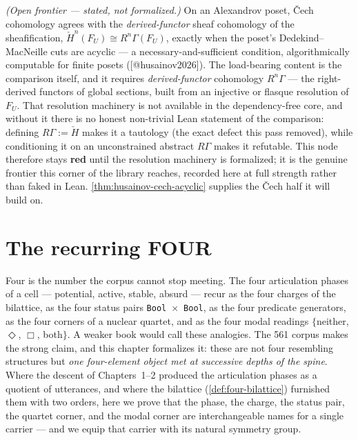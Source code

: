 \begin{theorem}[Husainov: \v{C}ech $=$ derived-functor cohomology]\label{thm:husainov-cech-derived}\notready{}
\emph{(Open frontier --- stated, not formalized.)} On an Alexandrov poset, \v{C}ech cohomology
agrees with the \emph{derived-functor} sheaf cohomology of the sheafification,
$\check{H}^n(F_U) \cong R^n\Gamma(F_U)$, exactly when the poset's Dedekind--MacNeille cuts are
acyclic --- a necessary-and-sufficient condition, algorithmically computable for finite posets
([@husainov2026]). The load-bearing content is the comparison itself, and it requires
\emph{derived-functor} cohomology $R^n\Gamma$ --- the right-derived functors of global sections,
built from an injective or flasque resolution of $F_U$. That resolution machinery is not
available in the dependency-free core, and without it there is no honest non-trivial Lean
statement of the comparison: defining $R\Gamma := \check{H}$ makes it a tautology (the exact
defect this pass removed), while conditioning it on an unconstrained abstract $R\Gamma$ makes it
refutable. This node therefore stays \textbf{red} until the resolution machinery is formalized;
it is the genuine frontier this corner of the library reaches, recorded here at full strength
rather than faked in Lean. \cref{thm:husainov-cech-acyclic} supplies the \v{C}ech half it will
build on.
\end{theorem}

\chapter{The recurring FOUR}\label{ch:four}

Four is the number the corpus cannot stop meeting. The four articulation phases of a cell --- potential, active, stable, absurd --- recur as the four charges of the bilattice, as the four status pairs \texttt{Bool}~$\times$~\texttt{Bool}, as the four predicate generators, as the four corners of a nuclear quartet, and as the four modal readings $\{$neither, $\Diamond$, $\Box$, both$\}$. A weaker book would call these analogies. The 561 corpus makes the strong claim, and this chapter formalizes it: these are not four resembling structures but \emph{one four-element object met at successive depths of the spine}. Where the descent of Chapters~1--2 produced the articulation phases as a quotient of utterances, and where the bilattice (\ref{def:four-bilattice}) furnished them with two orders, here we prove that the phase, the charge, the status pair, the quartet corner, and the modal corner are interchangeable names for a single carrier --- and we equip that carrier with its natural symmetry group.

